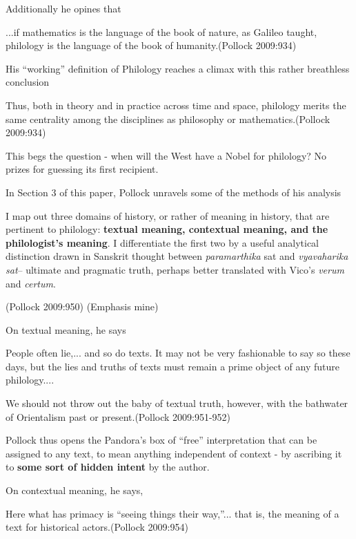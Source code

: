 Additionally he opines that
\begin{myquote}
...if mathematics is the language of the book of nature, as Galileo taught, philology is the language of the book of humanity.\hfill (Pollock 2009:934)
\end{myquote}

His ``working'' definition of Philology reaches a climax with this rather breathless conclusion
\begin{myquote}
Thus, both in theory and in practice across time and space, philology merits the same centrality among the disciplines as philosophy or mathematics.\hfill (Pollock 2009:934)
\end{myquote}

This begs the question - when will the West have a Nobel for philology? No prizes for guessing its first recipient.

In Section 3 of this paper, Pollock unravels some of the methods of his analysis
\begin{myquote}
I map out three domains of history, or rather of meaning in history, that are pertinent to philology: {\bf textual meaning, contextual meaning, and the philologist's meaning}. I differentiate the first two by a useful analytical distinction drawn in Sanskrit thought between {\sl paramarthika} sat and {\sl vyavaharika sat}-- ultimate and pragmatic truth, perhaps better translated with Vico's {\sl verum} and {\sl certum}.

\hfill (Pollock 2009:950) (Emphasis mine)
\end{myquote}

On textual meaning, he says
\begin{myquote}
People often lie,... and so do texts. It may not be very fashionable to say so these days, but the lies and truths of texts must remain a prime object of any future philology....

We should not throw out the baby of textual truth, however, with the bathwater of Orientalism past or present.\hfill (Pollock 2009:951-952)
\end{myquote}

Pollock thus opens the Pandora's box of ``free'' interpretation that can be assigned to any text, to mean anything independent of context - by ascribing it to {\bf some sort of hidden intent} by the author.

On contextual meaning, he says,
\begin{myquote}
Here what has primacy is ``seeing things their way,''... that is, the meaning of a text for historical actors.\hfill (Pollock 2009:954)
\end{myquote}

